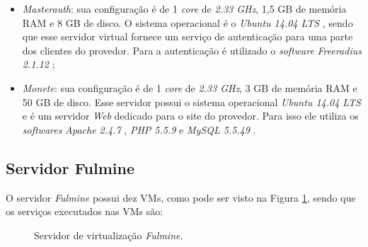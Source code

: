 \begin{itemize}
 \item \textit{Masterauth}: sua configuração é de 1 \textit{core} de \textit{2.33 GHz}, 1,5 GB de memória \ac{RAM} e 8 GB de disco. 
 O sistema operacional é o \textit{Ubuntu 14.04 \ac{LTS}} \cite{ubuntu}, sendo que esse servidor virtual fornece um serviço de autenticação 
  \cite{javvin2005} para uma parte dos clientes do provedor. Para a autenticação é utilizado o \textit{software} 
 \textit{Freeradius 2.1.12} \cite{freeradius};
 
 \item \textit{Monete}: sua configuração é de 1 \textit{core} de \textit{2.33 GHz}, 3 GB de memória \ac{RAM} e 50 GB de disco. 
 Esse servidor possui o sistema operacional \textit{Ubuntu 14.04 \ac{LTS}} \cite{ubuntu} e é um servidor \textit{Web} dedicado para o site do 
 provedor. Para isso ele utiliza os \textit{softwares} \textit{Apache 2.4.7} \cite{apache}, \textit{\ac{PHP} 5.5.9} \cite{php} e 
 \textit{MySQL 5.5.49} \cite{mysql}.
\end{itemize}

\subsection{Servidor Fulmine}
\label{section:serv_fulmine}

O servidor \textit{Fulmine} possui dez \acp{VM}, como pode ser visto na Figura \ref{fig:servidor_fulmine}, sendo que os serviços executados nas 
\acp{VM} são:

\begin{figure}[h!]
 \centering
 \caption{Servidor de virtualização \textit{Fulmine}.}
 \label{fig:servidor_fulmine}
\end{figure}

